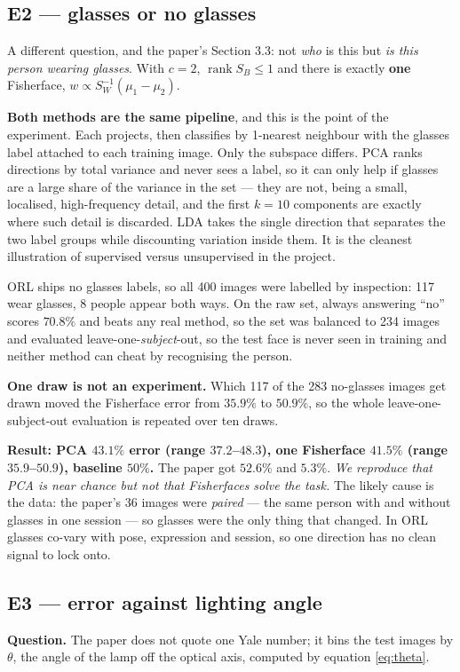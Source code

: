 \documentclass[11pt]{article}
\begin{document}
\subsection{E2 --- glasses or no glasses}
A different question, and the paper's Section 3.3: not \emph{who} is this but
\emph{is this person wearing glasses}. With $c=2$,
$\operatorname{rank}S_B\le1$ and there is exactly \textbf{one} Fisherface,
$w\propto S_W^{-1}(\mu_1-\mu_2)$.

\textbf{Both methods are the same pipeline}, and this is the point of the
experiment. Each projects, then classifies by 1-nearest neighbour with the
glasses label attached to each training image. Only the subspace differs. PCA
ranks directions by total variance and never sees a label, so it can only help
if glasses are a large share of the variance in the set --- they are not, being
a small, localised, high-frequency detail, and the first $k=10$ components are
exactly where such detail is discarded. LDA takes the single direction that
separates the two label groups while discounting variation inside them. It is
the cleanest illustration of supervised versus unsupervised in the project.

ORL ships no glasses labels, so all 400 images were labelled by inspection: 117
wear glasses, 8 people appear both ways. On the raw set, always answering
``no'' scores $70.8\%$ and beats any real method, so the set was balanced to
234 images and evaluated leave-one-\emph{subject}-out, so the test face is never
seen in training and neither method can cheat by recognising the person.

\textbf{One draw is not an experiment.} Which 117 of the 283 no-glasses images
get drawn moved the Fisherface error from $35.9\%$ to $50.9\%$, so the whole
leave-one-subject-out evaluation is repeated over ten draws.

\textbf{Result: PCA $43.1\%$ error (range $37.2$--$48.3$), one Fisherface
$41.5\%$ (range $35.9$--$50.9$), baseline $50\%$.}
The paper got $52.6\%$ and $5.3\%$. \emph{We reproduce that PCA is near chance
but not that Fisherfaces solve the task.} The likely cause is the data: the
paper's 36 images were \emph{paired} --- the same person with and without
glasses in one session --- so glasses were the only thing that changed. In ORL
glasses co-vary with pose, expression and session, so one direction has no
clean signal to lock onto.

\subsection{E3 --- error against lighting angle}
\textbf{Question.} The paper does not quote one Yale number; it bins the test
images by $\theta$, the angle of the lamp off the optical axis, computed by
equation \eqref{eq:theta}.
\end{document}

